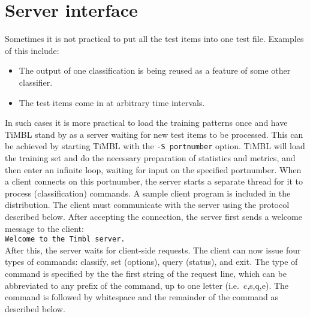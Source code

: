 \documentclass{report}
\begin{document}
\chapter{Server interface}
\label{serverformat}

Sometimes it is not practical to put all the test items into one test
file. Examples of this include:

\begin{itemize}
\item The output of one classification is being reused as a feature of
some other classifier.
\item The test items come in at arbitrary time intervals.
\end{itemize}

In such cases it is more practical to load the training patterns once
and have TiMBL stand by as a server waiting for new test items to be
processed. This can be achieved by starting TiMBL with the {\tt -S
portnumber} option. TiMBL will load the training set and do the
necessary preparation of statistics and metrics, and then enter an
infinite loop, waiting for input on the specified portnumber. When a
client connects on this portnumber, the server starts a separate
thread for it to process (classification) commands. A sample client
program is included in the distribution. The client must communicate
with the server using the protocol described below. After accepting
the connection, the server first sends a welcome message to the client:\\
{\tt Welcome to the Timbl server.}\\
After this, the server waits for client-side requests.
The client can now issue four types of commands: classify, set
(options), query (status), and exit. The type of command is specified
by the the first string of the request line, which can be abbreviated
to any prefix of the command, up to one letter (i.e.~c,s,q,e). The
command is followed by whitespace and the remainder of the command as
described below.
\end{document}
